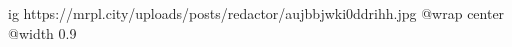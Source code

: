  
 
 
 
 

\ifcmt
  ig https://mrpl.city/uploads/posts/redactor/aujbbjwki0ddrihh.jpg
  @wrap center
  @width 0.9
\fi

